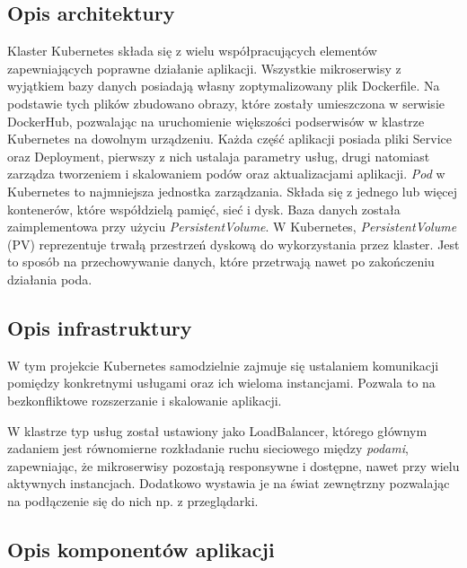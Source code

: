 \documentclass[12pt,a4paper]{article}
\begin{document}
\subsection{Opis architektury}
\label{sec:introduction}
Klaster Kubernetes składa się z wielu współpracujących elementów zapewniających poprawne działanie aplikacji. Wszystkie mikroserwisy z wyjątkiem bazy danych posiadają własny zoptymalizowany plik Dockerfile. Na podstawie tych plików zbudowano obrazy, które zostały umieszczona w serwisie DockerHub, pozwalając na uruchomienie większości podserwisów w klastrze Kubernetes na dowolnym urządzeniu. Każda część aplikacji posiada pliki Service oraz Deployment, pierwszy z nich ustalaja parametry usług, drugi natomiast zarządza tworzeniem i skalowaniem podów oraz aktualizacjami aplikacji. \textit{Pod} w Kubernetes to najmniejsza jednostka zarządzania. Składa się z jednego lub więcej kontenerów, które współdzielą pamięć, sieć i dysk.
\newline
\newline
Baza danych została zaimplementowa przy użyciu \textit{PersistentVolume}. W Kubernetes, \textit{PersistentVolume} (PV) reprezentuje trwałą przestrzeń dyskową do wykorzystania przez klaster. Jest to sposób na przechowywanie danych, które przetrwają nawet po zakończeniu działania poda. \cite{Stepik}
\subsection{Opis infrastruktury}
\label{sec:Users}
W tym projekcie Kubernetes samodzielnie zajmuje się ustalaniem komunikacji pomiędzy konkretnymi usługami oraz ich wieloma instancjami. Pozwala to na bezkonfliktowe rozszerzanie i skalowanie aplikacji.

W klastrze typ usług został ustawiony jako LoadBalancer, którego głównym zadaniem jest równomierne rozkładanie ruchu sieciowego między \textit{podami}, zapewniając, że mikroserwisy pozostają responsywne i dostępne, nawet przy wielu aktywnych instancjach. Dodatkowo wystawia je na świat zewnętrzny pozwalając na podłączenie się do nich np. z przeglądarki.

\newpage
\subsection{Opis komponentów aplikacji}
\label{sec:FunctionalConditions}
\end{document}
